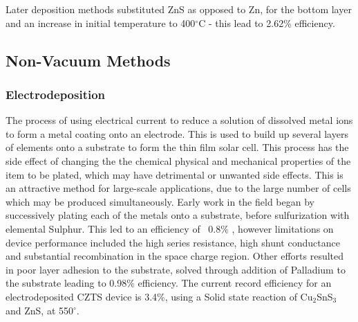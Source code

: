 Later deposition methods substituted ZnS as opposed to Zn, for the bottom layer and an increase in initial temperature to 400$^\circ$C - this lead to 2.62\% efficiency.\citep{todorov_high-efficiency_2010}


\subsection{Non-Vacuum Methods}
\subsubsection{Electrodeposition}
The process of using electrical current to reduce a solution of dissolved metal ions to form a metal coating onto an electrode. This is used to build up several layers of elements onto a substrate to form the thin film solar cell. This process has the side effect of changing the the chemical physical and mechanical properties of the item to be plated, which may have detrimental or unwanted side effects. This is an attractive method for large-scale applications, due to the large number of cells which may be produced simultaneously. Early work in the field began by successively plating each of the metals onto a substrate, before sulfurization with elemental Sulphur. This led to an efficiency of ~0.8\% \citep{scragg_new_2008}, however limitations on device performance included the high series resistance, high shunt conductance and substantial recombination in the space charge region. Other efforts resulted in poor layer adhesion to the substrate, solved through addition of Palladium to the substrate leading to 0.98\% efficiency. The current record efficiency for an electrodeposited CZTS device is 3.4\%, using a Solid state reaction of Cu$_2$SnS$_3$ and ZnS, at 550$^\circ$.
